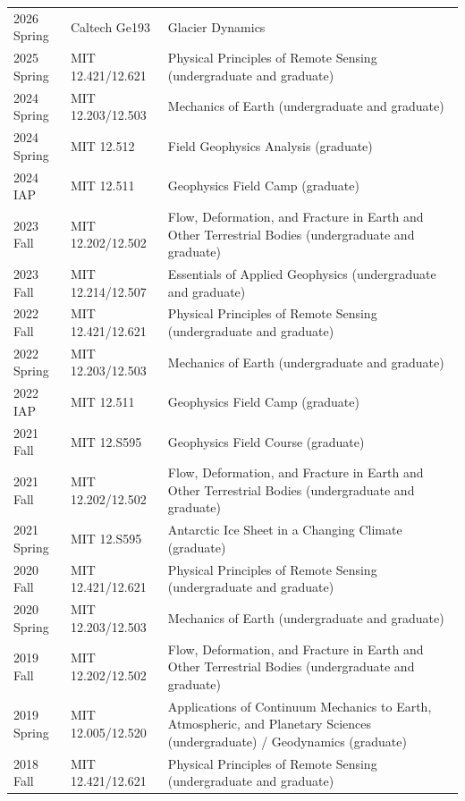 \documentclass[11pt, oneside]{article}
\newcommand{\cvsection}[1]{%
  \vspace{4mm}%
  \noindent{\large\sffamily\bfseries\color{DeepTeal}#1}%
  \vspace{1mm}%
  \par\noindent{\color{CaltechOrange}\rule{\textwidth}{0.8pt}}%
  \vspace{2mm}%
}
\begin{document}
\cvsection{Teaching}
\vspace{-2mm}
\begin{longtable}[h]{l l p{10.5cm}}
2026 Spring & Caltech Ge193 & Glacier Dynamics \\
2025 Spring & MIT 12.421/12.621 & Physical Principles of Remote Sensing (undergraduate and graduate) \\
2024 Spring & MIT 12.203/12.503 & Mechanics of Earth (undergraduate and graduate) \\
2024 Spring & MIT 12.512 & Field Geophysics Analysis (graduate) \\
2024 IAP & MIT 12.511 & Geophysics Field Camp (graduate) \\
2023 Fall & MIT 12.202/12.502 & Flow, Deformation, and Fracture in Earth and Other Terrestrial Bodies (undergraduate and graduate) \\
2023 Fall & MIT 12.214/12.507 & Essentials of Applied Geophysics (undergraduate and graduate) \\
2022 Fall & MIT 12.421/12.621 & Physical Principles of Remote Sensing (undergraduate and graduate) \\
2022 Spring & MIT 12.203/12.503 & Mechanics of Earth (undergraduate and graduate) \\
2022 IAP & MIT 12.511 & Geophysics Field Camp (graduate) \\
2021 Fall & MIT 12.S595 & Geophysics Field Course (graduate) \\
2021 Fall & MIT 12.202/12.502 & Flow, Deformation, and Fracture in Earth and Other Terrestrial Bodies (undergraduate and graduate) \\
2021 Spring & MIT 12.S595 & Antarctic Ice Sheet in a Changing Climate (graduate) \\
2020 Fall & MIT 12.421/12.621 & Physical Principles of Remote Sensing (undergraduate and graduate) \\
2020 Spring & MIT 12.203/12.503 & Mechanics of Earth (undergraduate and graduate) \\
2019 Fall & MIT 12.202/12.502 & Flow, Deformation, and Fracture in Earth and Other Terrestrial Bodies (undergraduate and graduate) \\
2019 Spring & MIT 12.005/12.520 & Applications of Continuum Mechanics to Earth, Atmospheric, and Planetary Sciences (undergraduate) / Geodynamics (graduate) \\
2018 Fall & MIT 12.421/12.621 & Physical Principles of Remote Sensing (undergraduate and graduate)
\end{longtable}
\vspace{-5mm}
\end{document}
